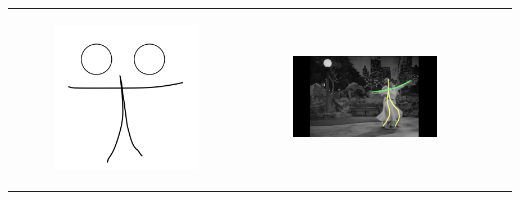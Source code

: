 \begin{table}[!htb]
\begin{tabular}{cccc}
\begin{subfigure}{0.2\textwidth}\centering\includegraphics[scale=0.1]{img/05keyframe}\end{subfigure}&
\begin{subfigure}{0.23\textwidth}\centering\includegraphics[scale=0.08]{img/keyframe_case_5_(3)}\end{subfigure}&

\end{tabular}
\end{table}
